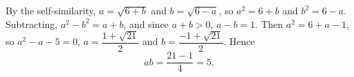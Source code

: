 By the self-similarity, $a=\sqrt{6+b}$ and $b=\sqrt{6-a}$, so $a^2=6+b$ and $b^2=6-a$. Subtracting, $a^2-b^2=a+b$, and since $a+b>0$, $a-b=1$. Then $a^2=6+a-1$, so $a^2-a-5=0$, $a=\dfrac{1+\sqrt{21}}{2}$ and $b=\dfrac{-1+\sqrt{21}}{2}$. Hence
\[
ab=\dfrac{21-1}{4}=\boxed{5}.
\]
